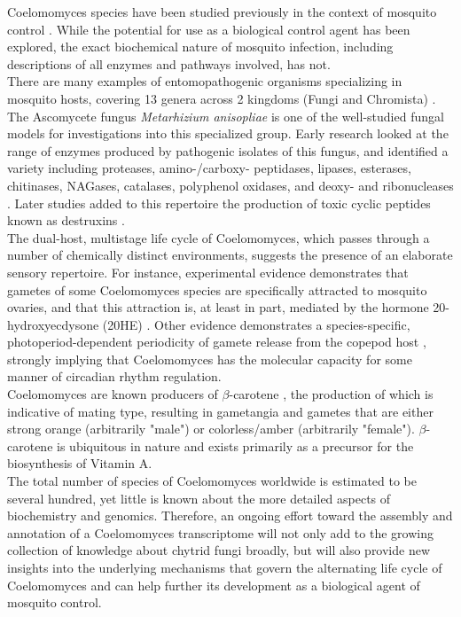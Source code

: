 \indent Coelomomyces species have been studied previously in the context of mosquito control \cite{Scholte2004}. While the potential for use as a biological control agent has been explored, the exact biochemical nature of mosquito infection, including descriptions of all enzymes and pathways involved, has not. \\
\indent There are many examples of entomopathogenic organisms specializing in mosquito hosts, covering 13 genera across 2 kingdoms (Fungi and Chromista) \cite{Scholte2004}. The Ascomycete fungus \textit{Metarhizium anisopliae} is one of the well-studied fungal models for investigations into this specialized group. Early research looked at the range of enzymes produced by pathogenic isolates of this fungus, and identified a variety including proteases, amino-/carboxy- peptidases, lipases, esterases, chitinases, NAGases, catalases, polyphenol oxidases, and deoxy- and ribonucleases \cite{StLeger1986}. Later studies added to this repertoire the production of toxic cyclic peptides known as destruxins \cite{Wang2012}. \\ 
\indent The dual-host, multistage life cycle of Coelomomyces, which passes through a number of chemically distinct environments, suggests the presence of an elaborate sensory repertoire. For instance, experimental evidence demonstrates that gametes of some Coelomomyces species are specifically attracted to mosquito ovaries, and that this attraction is, at least in part, mediated by the hormone 20-hydroxyecdysone (20HE) \cite{Lucarotti1992}. Other evidence demonstrates a species-specific, photoperiod-dependent periodicity of gamete release from the copepod host \cite{Federici1983}, strongly implying that Coelomomyces has the molecular capacity for some manner of circadian rhythm regulation. \\
\indent Coelomomyces are known producers of $\beta$-carotene \cite{Federici1979}, the production of which is indicative of mating type, resulting in gametangia and gametes that are either strong orange (arbitrarily "male") or colorless/amber (arbitrarily "female"). $\beta$-carotene is ubiquitous in nature and exists primarily as a precursor for the biosynthesis of Vitamin A.\\
\indent The total number of species of Coelomomyces worldwide is estimated to be several hundred, yet little is known about the more detailed aspects of biochemistry and genomics. Therefore, an ongoing effort toward the assembly and annotation of a Coelomomyces transcriptome will not only add to the growing collection of knowledge about chytrid fungi broadly, but will also provide new insights into the underlying mechanisms that govern the alternating life cycle of Coelomomyces and can help further its development as a biological agent of mosquito control. \\
